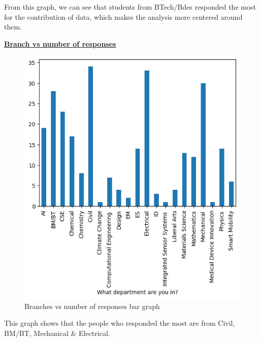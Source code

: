 \documentclass{article}
\begin{document}
From this graph, we can see that students from BTech/Bdes responded the most for the contribution of data, which makes the analysis more centered around them.\\
\centerline{\underline{\bfseries{Branch vs number of responses}}}
\begin{figure}[H]
    \centering
    \includegraphics[scale = 0.6]{bar_department.png}
    \caption{Branches vs number of responses bar graph}  
    \label{fig:bar_department}
\end{figure}
This graph shows that the people who responded the most are from Civil, BM/BT, Mechanical \& Electrical.\\
\end{document}
